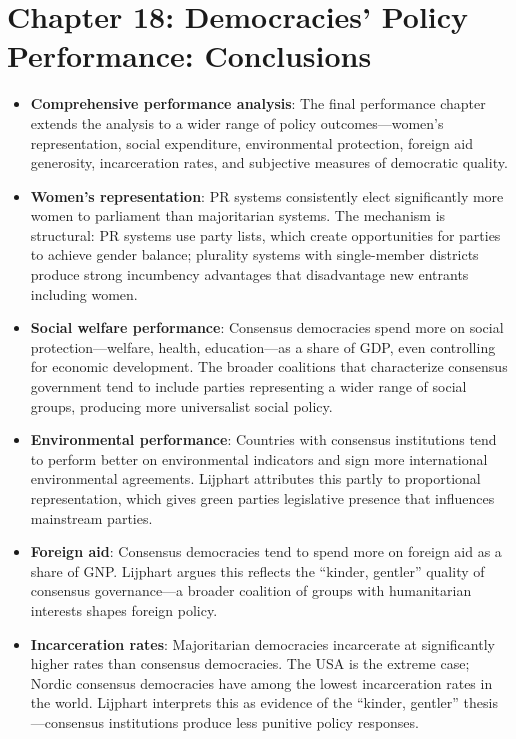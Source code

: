 \documentclass[12pt]{article}
\begin{document}
\section{Chapter 18: Democracies' Policy Performance: Conclusions}

\begin{itemize}[leftmargin=*, itemsep=4pt]
    \item \textbf{Comprehensive performance analysis}: The final performance chapter extends the analysis to a wider range of policy outcomes---women's representation, social expenditure, environmental protection, foreign aid generosity, incarceration rates, and subjective measures of democratic quality.
    \item \textbf{Women's representation}: PR systems consistently elect significantly more women to parliament than majoritarian systems. The mechanism is structural: PR systems use party lists, which create opportunities for parties to achieve gender balance; plurality systems with single-member districts produce strong incumbency advantages that disadvantage new entrants including women.
    \item \textbf{Social welfare performance}: Consensus democracies spend more on social protection---welfare, health, education---as a share of GDP, even controlling for economic development. The broader coalitions that characterize consensus government tend to include parties representing a wider range of social groups, producing more universalist social policy.
    \item \textbf{Environmental performance}: Countries with consensus institutions tend to perform better on environmental indicators and sign more international environmental agreements. Lijphart attributes this partly to proportional representation, which gives green parties legislative presence that influences mainstream parties.
    \item \textbf{Foreign aid}: Consensus democracies tend to spend more on foreign aid as a share of GNP. Lijphart argues this reflects the ``kinder, gentler'' quality of consensus governance---a broader coalition of groups with humanitarian interests shapes foreign policy.
    \item \textbf{Incarceration rates}: Majoritarian democracies incarcerate at significantly higher rates than consensus democracies. The USA is the extreme case; Nordic consensus democracies have among the lowest incarceration rates in the world. Lijphart interprets this as evidence of the ``kinder, gentler'' thesis---consensus institutions produce less punitive policy responses.

\end{itemize}
\end{document}
